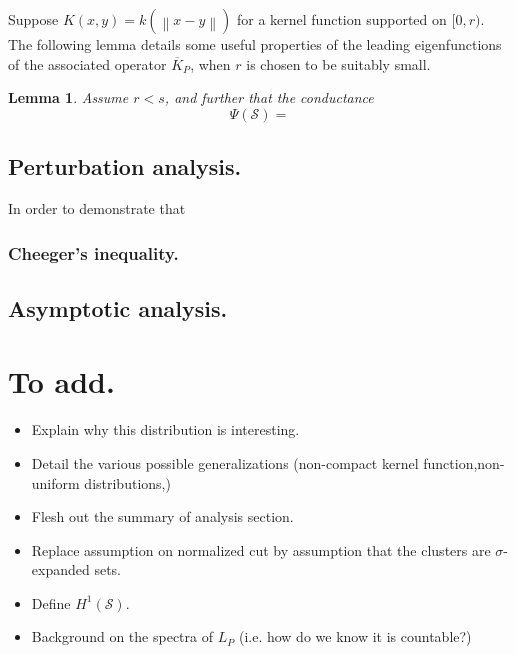 \documentclass{article}
\newcommand{\norm}[1]{\left\lVert#1\right\rVert}
\newcommand{\1}{\mathbf{1}}
\newcommand{\Sset}{\mathcal{S}}
\theoremstyle{alden}
\theoremstyle{aldenthm}
\newtheorem{lemma}{Lemma}
\theoremstyle{definition}
\theoremstyle{remark}
\begin{document}
Suppose $K(x,y) = k(\norm{x - y})$ for a kernel function supported on $[0,r)$. The following lemma details some useful properties of the leading eigenfunctions of the associated operator $\overline{K}_P$, when $r$ is chosen to be suitably small. 

\begin{lemma}
	Assume $r < s$, and further that the conductance 
	\begin{equation*}
	\Psi(\Sset) = 
	\end{equation*}
\end{lemma}

\subsection{Perturbation analysis.}

In order to demonstrate that 

\subsubsection{Cheeger's inequality.}

\subsection{Asymptotic analysis.}


\section{To add.}

\begin{itemize}
	\item Explain why this distribution is interesting.
	\item Detail the various possible generalizations (non-compact kernel function,non-uniform distributions,)
	\item Flesh out the summary of analysis section.
	\item Replace assumption on normalized cut by assumption that the clusters are $\sigma$-expanded sets. 
	\item Define $H^1(\mathcal{S})$.
	\item Background on the spectra of $L_P$ (i.e. how do we know it is countable?)
\end{itemize}
\end{document}

